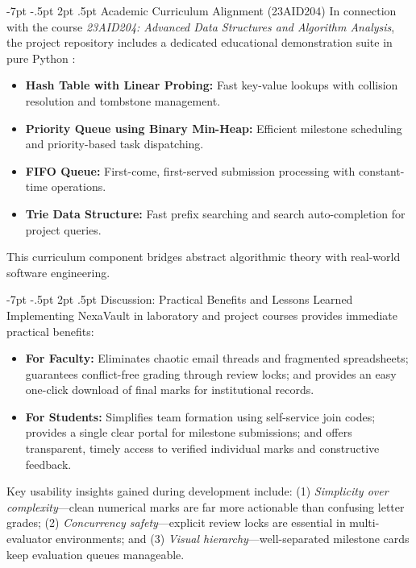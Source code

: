 \documentclass[11pt,a4paper]{article}
\makeatletter
\renewcommand\section{\@startsection {section}{1}{\z@}%
  {-7pt \@plus -1.5pt \@minus -.5pt}%
  {2pt \@plus .5pt}%
  {\normalfont\large\bfseries\color{nexaNavy}}}
\makeatother
\begin{document}
\section{Academic Curriculum Alignment (23AID204)}
In connection with the course \textit{23AID204: Advanced Data Structures and Algorithm Analysis}, the project repository includes a dedicated educational demonstration suite in pure Python \cite{cormen2022introduction}:
\begin{itemize}
  \item \textbf{Hash Table with Linear Probing:} Fast key-value lookups with collision resolution and tombstone management.
  \item \textbf{Priority Queue using Binary Min-Heap:} Efficient milestone scheduling and priority-based task dispatching.
  \item \textbf{FIFO Queue:} First-come, first-served submission processing with constant-time operations.
  \item \textbf{Trie Data Structure:} Fast prefix searching and search auto-completion for project queries.
\end{itemize}
This curriculum component bridges abstract algorithmic theory with real-world software engineering.

\clearpage

\section{Discussion: Practical Benefits and Lessons Learned}
Implementing NexaVault in laboratory and project courses provides immediate practical benefits:
\begin{itemize}
  \setlength{\itemsep}{0pt}\setlength{\parskip}{0pt}
  \item \textbf{For Faculty:} Eliminates chaotic email threads and fragmented spreadsheets; guarantees conflict-free grading through review locks; and provides an easy one-click download of final marks for institutional records.
  \item \textbf{For Students:} Simplifies team formation using self-service join codes; provides a single clear portal for milestone submissions; and offers transparent, timely access to verified individual marks and constructive feedback.
\end{itemize}
Key usability insights gained during development include: (1) \textit{Simplicity over complexity}---clean numerical marks are far more actionable than confusing letter grades; (2) \textit{Concurrency safety}---explicit review locks are essential in multi-evaluator environments; and (3) \textit{Visual hierarchy}---well-separated milestone cards keep evaluation queues manageable.
\end{document}
